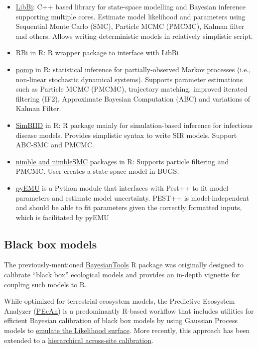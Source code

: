 \documentclass[
]{book}
\providecommand{\tightlist}{%
  \setlength{\itemsep}{0pt}\setlength{\parskip}{0pt}}
\begin{document}
\begin{enumerate}
  \begin{itemize}
  \tightlist
  \item
    \href{http://libbi.org/}{LibBi}: C++ based library for state-space modelling and Bayesian inference supporting multiple cores. Estimate model likelihood and parameters using Sequential Monte Carlo (SMC), Particle MCMC (PMCMC), Kalman filter and others. Allows writing deterministic models in relatively simplistic script.
  \item
    \href{https://cran.r-project.org/web/packages/rbi/vignettes/introduction.html}{RBi} in R: R wrapper package to interface with LibBi
  \item
    \href{https://tjmckinley.github.io/SimBIID_tutorial/}{pomp} in R: statistical inference for partially-observed Markov processes (i.e., non-linear stochastic dynamical systems). Supports parameter estimations such as Particle MCMC (PMCMC), trajectory matching, improved iterated filtering (IF2), Approximate Bayesian Computation (ABC) and variations of Kalman Filter.
  \item
    \href{https://tjmckinley.github.io/SimBIID_tutorial/}{SimBIID} in R: R package mainly for simulation-based inference for infectious disease models. Provides simplistic syntax to write SIR models. Support ABC-SMC and PMCMC.
  \item
    \href{https://r-nimble.org/}{nimble and nimbleSMC} packages in R: Supports particle filtering and PMCMC. User creates a state-space model in BUGS.
  \item
    \href{https://pypi.org/project/pyemu/}{pyEMU} is a Python module that interfaces with Pest++ to fit model parameters and estimate model uncertainty. PEST++ is model-independent and should be able to fit parameters given the correctly formatted inputs, which is facilitated by pyEMU
  \end{itemize}
\end{enumerate}

\hypertarget{black-box-models}{%
\subsection{Black box models}\label{black-box-models}}

The previously-mentioned \href{https://cran.r-project.org/web/packages/BayesianTools/index.html}{BayesianTools} R package was originally designed to calibrate ``black box'' ecological models and provides an in-depth vignette for coupling such models to R.

While optimized for terrestrial ecosystem models, the Predictive Ecosystem Analyzer (\href{https://pecanproject.github.io/}{PEcAn}) is a predominantly R-based workflow that includes utilities for efficient Bayesian calibration of black box models by using Gaussian Process models to \href{https://doi.org/10.5194/bg-15-5801-2018}{emulate the Likelihood surface}. More recently, this approach has been extended to a \href{https://www.biorxiv.org/content/10.1101/2021.04.28.441243v1}{hierarchical across-site calibration}.
\end{document}
